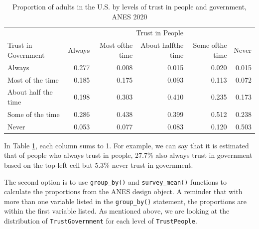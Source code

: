\documentclass[
]{krantz}
\begin{document}
\begin{longtable}{l|rrrrr}
\caption{\label{tab:stattest-chi-ex2-prop1-tab}Proportion of adults in the U.S. by levels of trust in people and government, ANES 2020}\\
\toprule
\multicolumn{1}{l}{} & \multicolumn{5}{c}{Trust in People} \\ 
\cmidrule(lr){2-6}
\multicolumn{1}{l}{Trust in Government} & Always & Most ofthe time & About halfthe time & Some ofthe time & Never \\ 
\midrule
Always & 0.277 & 0.008 & 0.015 & 0.020 & 0.015 \\ 
Most of the time & 0.185 & 0.175 & 0.093 & 0.113 & 0.072 \\ 
About half the time & 0.198 & 0.303 & 0.410 & 0.235 & 0.173 \\ 
Some of the time & 0.286 & 0.438 & 0.399 & 0.512 & 0.238 \\ 
Never & 0.053 & 0.077 & 0.083 & 0.120 & 0.503 \\ 
\bottomrule
\end{longtable}

In Table \ref{tab:stattest-chi-ex2-prop1-tab}, each column sums to 1. For example, we can say that it is estimated that of people who always trust in people, 27.7\% also always trust in government based on the top-left cell but 5.3\% never trust in government.

The second option is to use \texttt{group\_by()} and \texttt{survey\_mean()} functions to calculate the proportions from the ANES design object. A reminder that with more than one variable listed in the \texttt{group\_by()} statement, the proportions are within the first variable listed. As mentioned above, we are looking at the distribution of \texttt{TrustGovernment} for each level of \texttt{TrustPeople}.
\end{document}
